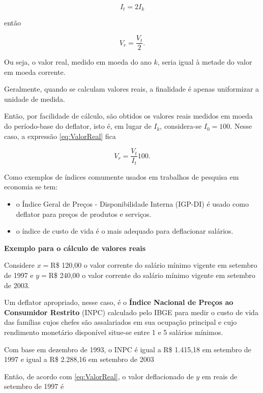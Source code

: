\documentclass[
]{book}
\begin{document}
\begin{equation}
  I_t = 2I_k
\end{equation}

então

\begin{equation}
  V_r = \frac{V_t}{2}.
\end{equation}

Ou seja, o valor real, medido em moeda do ano \(k\), seria igual à metade do valor em moeda corrente.

Geralmente, quando se calculam valores reais, a finalidade é apenas uniformizar a unidade de medida.

Então, por facilidade de cálculo, são obtidos os valores reais medidos em moeda do período-base do deflator, isto é, em lugar de \(I_k\), considera-se \(I_0 = 100\). Nesse caso, a expressão \eqref{eq:ValorReal} fica

\begin{equation}
  V_r = \frac{V_t}{I_t}100.
  \label{eq:ValorRealEmPorcentagem}
\end{equation}

Como exemplos de índices comumente usados em trabalhos de pesquisa em economia se tem:

\begin{itemize}
\item
  o Índice Geral de Preços - Disponibilidade Interna (IGP-DI) é usado como deflator para preços de produtos e serviços.
\item
  o índice de custo de vida é o mais adequado para deflacionar salários.
\end{itemize}

\textbf{Exemplo para o cálculo de valores reais}

Considere \(x=\)R\$ 120,00 o valor corrente do salário mínimo vigente em setembro de 1997 e \(y=\)R\$ 240,00 o valor corrente do salário mínimo vigente em setembro de 2003.

Um deflator apropriado, nesse caso, é o \textbf{Índice Nacional de Preços ao Consumidor Restrito} (INPC) calculado pelo IBGE para medir o custo de vida das famílias cujos chefes são assalariados em sua ocupação principal e cujo rendimento monetário disponível situe-se entre 1 e 5 salários mínimos.

Com base em dezembro de 1993, o INPC é igual a R\$ 1.415,18 em setembro de 1997 e igual a R\$ 2.288,16 em setembro de 2003

Então, de acordo com \eqref{eq:ValorReal}, o valor deflacionado de \(y\) em reais de
setembro de 1997 é
\end{document}
